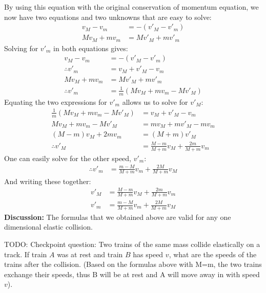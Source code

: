 \begin{example}
By using this equation with the original conservation of momentum equation, we now have two equations and two unknowns that are easy to solve:
\begin{align*}
v_M-v_m &= - (v'_M-v'_m)\\
Mv_M+mv_m&=Mv'_M+mv'_m
\end{align*}
Solving for $v'_m$ in both equations gives:
\begin{align*}
v_M-v_m &= - (v'_M-v'_m)\\
\therefore v'_m &= v_M+v'_M-v_m\\
Mv_M+mv_m&=Mv'_M+mv'_m\\
\therefore v'_m&=\frac{1}{m}(Mv_M+mv_m-Mv'_M)
\end{align*}
Equating the two expressions for $v'_m$ allows us to solve for $v'_M$:
\begin{align*}
\frac{1}{m}(Mv_M+mv_m-Mv'_M)&=v_M+v'_M-v_m\\
Mv_M+mv_m-Mv'_M&=mv_M+mv'_M-mv_m\\
(M-m)v_M+2mv_m&=(M+m)v'_M\\
\therefore v'_M&=\frac{M-m}{M+m}v_M+\frac{2m}{M+m}v_m
\end{align*}
One can easily solve for the other speed, $v'_m$:
\begin{align*}
\therefore v'_m &= \frac{m-M}{M+m}v_m+\frac{2M}{M+m}v_M
\end{align*}
And writing these together:
\begin{align*}
v'_M&=\frac{M-m}{M+m}v_M+\frac{2m}{M+m}v_m\\
v'_m &= \frac{m-M}{M+m}v_m+\frac{2M}{M+m}v_M
\end{align*}
\textbf{Discussion:} The formulas that we obtained above are valid for any one dimensional elastic collision. 
\end{example}

TODO: Checkpoint question: Two trains of the same mass collide elastically on a track. If train $A$ was at rest and train $B$ has speed $v$, what are the speeds of the trains after the collision. (Based on the formulas above with M=m, the two trains exchange their speeds, thus B will be at rest and A will move away in with speed $v$).



